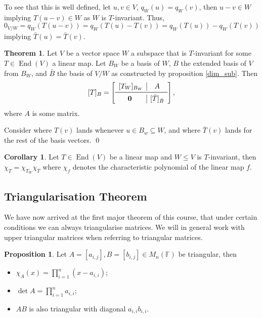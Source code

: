 \documentclass[
]{article}
\theoremstyle{definition}
\newtheorem{theorem}{Theorem}
\newtheorem{prop}{Proposition}[section]
\newtheorem{corollary}{Corollary}[theorem]
\theoremstyle{definition}
\begin{document}
To see that this is well defined, let \(u, v \in V\),
\(q_W(u) = q_W(v)\), then \(u - v \in W\) implying \(T(u - v) \in W\) as
\(W\) is \(T\)-invariant. Thus,
\(0_{V / W} = q_W(T(u - v)) = q_W(T(u) - T(v)) = q_W(T(u)) - q_W(T(v))\)
implying \(\bar{T}(u) = \bar{T}(v)\).

\begin{theorem}\label{blocks_quotient}
  Let \(V\) be a vector space \(W\) a subspace that is \(T\)-invariant for some 
  \(T \in \mathop{\mathrm{End}}(V)\) a linear map. Let \(B_W\) be a basis of \(W\), \(B\) the 
  extended basis of \(V\) from \(B_W\), and \(\bar{B}\) the basis of \(V / W\) 
  as constructed by proposition \ref{dim_sub}. Then 
  \[[T]_B = 
    \left[
    \begin{array}{c|c}
      [T_W]_{B_W} & A \\
      \midrule
      \mathbf{0} & [\bar{T}]_{\bar{B}}
    \end{array}
    \right],
  \]
  where \(A\) is some matrix.
\end{theorem}
\proof

Consider where \(T(v)\) lands whenever \(u \in B_w \subseteq W\), and
where \(\bar{T}(v)\) lands for the rest of the basis vectors. \qed

\begin{corollary}\label{prod_char}
  Let \(T \in \mathop{\mathrm{End}}(V)\) be a linear map and \(W \le V\) is \(T\)-invariant, 
  then \(\chi_T = \chi_{T_W} \chi_{\bar{T}}\) where \(\chi_f\) denotes the 
  characteristic polynomial of the linear map \(f\). 
\end{corollary}

\hypertarget{triangularisation-theorem}{%
\subsection{Triangularisation Theorem}\label{triangularisation-theorem}}

We have now arrived at the first major theorem of this course, that
under certain conditions we can always triangularise matrices. We will
in general work with upper triangular matrices when referring to
triangular matrices.

\begin{prop}
  Let \(A = [a_{i, j}], B = [b_{i, j}] \in M_n(\mathbb{F})\) be triangular, then 
  \begin{itemize}
    \item \(\chi_A(x) = \prod_{i = 1}^n (x - a_{i, i})\);
    \item \(\det A = \prod_{i = 1}^n a_{i, i}\);
    \item \(AB\) is also triangular with diagonal \(a_{i, i}b_{i, i}\).
  \end{itemize}
\end{prop}
\end{document}
